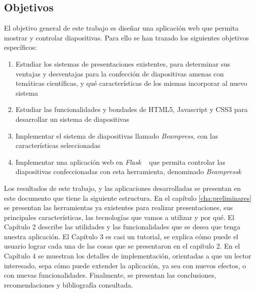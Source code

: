 \begin{introduction}
	\section*{Objetivos} %
	\label{sec:objetivos}

		El objetivo general de este trabajo es diseñar una aplicación web que permita mostrar y controlar diapositivas. Para ello se han trazado los siguientes objetivos específicos:

		\begin{enumerate}
			\item Estudiar los sistemas de presentaciones existentes, para determinar sus ventajas y desventajas para la confección de diapositivas amenas con temáticas científicas, y qué características de los mismas incorporar al nuevo sistema
			\item Estudiar las funcionalidades y bondades de HTML5, Javascript y CSS3 para desarrollar un sistema de diapositivas
			\item Implementar el sistema de diapositivas llamado \textit{Beampress}, con las características seleccionadas
			\item Implementar una aplicación web en \textit{Flask} ~\cite{flask, flaskbook} que permita controlar las diapositivas confeccionadas con esta herramienta, denominado \textit{Beampressk}
		\end{enumerate}

	
		Los resultados de este trabajo, y las aplicaciones desarrolladas se presentan en este documento que tiene la siguiente estructura. En el capítulo \ref{cha:preliminares} se presentan las herramientas ya existentes para realizar presentaciones, sus principales características, las tecnologías que vamos a utilizar y por qué. El Capítulo 2 describe las utilidades y las funcionalidades que se desea que tenga nuestra aplicación. El Capítulo 3 es casi un tutorial, se explica cómo puede el usuario lograr cada una de las cosas que se presentaron en el capítulo 2. En el Capítulo 4 se muestran los detalles de implementación, orientadas a que un lector interesado, sepa cómo puede extender la aplicación, ya sea con nuevos efectos, o con nuevas funcionalidades. Finalmente, se presentan las conclusiones, recomendaciones y bibliografía consultada.





\end{introduction}




